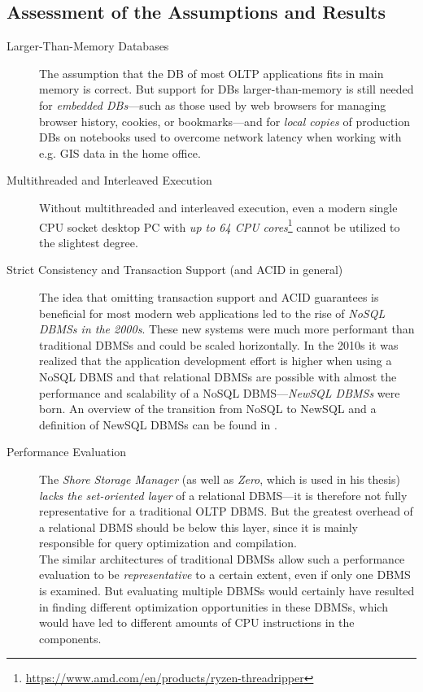 \subsection{Assessment of the Assumptions and Results}

    \begin{description}
        \item[Larger-Than-Memory Databases] The assumption that the DB of most OLTP applications fits in main memory is correct. But support for DBs larger-than-memory is still needed for \emph{embedded DBs}---such as those used by web browsers for managing browser history, cookies, or bookmarks---and for \emph{local copies} of production DBs on notebooks used to overcome network latency when working with e.g. GIS data in the home office.
        \item[Multithreaded and Interleaved Execution] Without multithreaded and interleaved execution, even a modern single CPU socket desktop PC with \emph{up to 64 CPU cores}\footnote{\url{https://www.amd.com/en/products/ryzen-threadripper}} cannot be utilized to the slightest degree.
        \item[Strict Consistency and Transaction Support (and ACID in general)] The idea that omitting transaction support and ACID guarantees is beneficial for most modern web applications led to the rise of \emph{NoSQL DBMSs in the 2000s}. These new systems were much more performant than traditional DBMSs and could be scaled horizontally. In the 2010s it was realized that the application development effort is higher when using a NoSQL DBMS and that relational DBMSs are possible with almost the performance and scalability of a NoSQL DBMS---\emph{NewSQL DBMSs} were born. An overview of the transition from NoSQL to NewSQL and a definition of NewSQL DBMSs can be found in \cite{Pavlo:2016}.
        \item[Performance Evaluation] The \textit{Shore Storage Manager} (as well as \textit{Zero}, which is used in his thesis) \emph{lacks the set-oriented layer} of a relational DBMS---it is therefore not fully representative for a traditional OLTP DBMS. But the greatest overhead of a relational DBMS should be below this layer, since it is mainly responsible for query optimization and compilation.\\
        The similar architectures of traditional DBMSs allow such a performance evaluation to be \emph{representative} to a certain extent, even if only one DBMS is examined. But evaluating multiple DBMSs would certainly have resulted in finding different optimization opportunities in these DBMSs, which would have led to different amounts of CPU instructions in the components.\\

\end{description}
